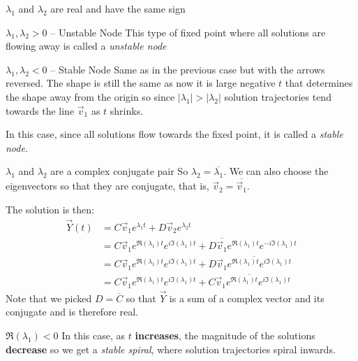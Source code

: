 \documentclass[../main.tex]{subfiles}
\begin{document}
\begin{proofcases}
\begin{case}{$\lambda_1$ and $\lambda_2$ are real and have the same sign}
\begin{proofcases}
\begin{case}{$\lambda_1, \lambda_2 > 0$ -- Unstable Node}
        This type of fixed point where all solutions are flowing away is called a \textit{unstable node}
      \end{case}
      \begin{case}{$\lambda_1, \lambda_2 < 0$ -- Stable Node}
        Same as in the previous case but with the arrows reversed.
        The shape is still the same as now it is large negative $t$ that determines the shape away from the origin so since $|\lambda_1| > |\lambda_2|$ solution trajectories tend towards the line $\vec{v}_1$ as $t$ shrinks.

        In this case, since all solutions flow towards the fixed point, it is called a \textit{stable node}.
      \end{case}
    \end{proofcases}
  \end{case}
  \begin{case}{$\lambda_1$ and $\lambda_2$ are a complex conjugate pair}
    So $\lambda_2 = \overline{\lambda_1}$.
    We can also choose the eigenvectors so that they are conjugate, that is,   $\vec{v}_2 = \overline{\vec{v}_1}$.

    The solution is then:
    \begin{align*}
      \vec{Y}(t) &= C \vec{v}_1 e^{\lambda_1 t} + D \vec{v}_2 e^{\lambda_2 t} \\
                 &= C \vec{v}_1 e^{\Re(\lambda_1)t}e^{i \Im(\lambda_1)t} + D \overline{\vec{v}_1} e^{\Re(\lambda_1)t}e^{-i\Im(\lambda_1)t} \\
                 &= C \vec{v}_1 e^{\Re(\lambda_1)t}e^{i \Im(\lambda_1)t} + D \overline{\vec{v}_1 e^{\Re(\lambda_1)t}e^{i\Im(\lambda_1)t}} \\
                 &= C \vec{v}_1 e^{\Re(\lambda_1)t}e^{i \Im(\lambda_1)t} + \overline{C \vec{v}_1 e^{\Re(\lambda_1)t}e^{i\Im(\lambda_1)t}}
    \end{align*}
    Note that we picked $D = \overline{C}$ so that $\vec{Y}$ is a sum of a complex vector and its conjugate and is therefore real.
    \begin{proofcases}
      \begin{case}{$\Re(\lambda_1) < 0$}
        In this case, as $t$ \textbf{increases}, the magnitude of the solutions \textbf{decrease} so we get a \textit{stable spiral}, where solution trajectories spiral inwards.

        \begin{center}
\end{center}
\end{case}
\end{proofcases}
\end{case}
\end{proofcases}
\end{document}
